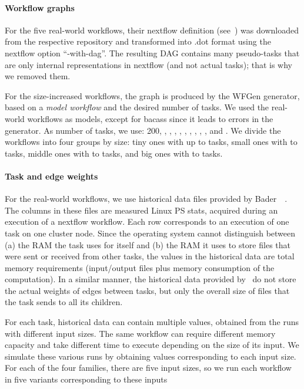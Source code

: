\documentclass[conference]{IEEEtran}
\begin{document}
\paragraph{Workflow graphs}
For the five real-world workflows, their nextflow definition (see~\cite{ewels2020nf}) was downloaded from the
respective repository and transformed into .dot format using the nextflow option ``-with-dag''.
The resulting DAG contains many pseudo-tasks that are only internal representations in nextflow
(and not actual tasks); that is why we removed them.

For the size-increased workflows, the graph is produced by the WFGen generator, based on a {\em model workflow} and
the desired number of tasks.
We used the real-world workflows as models, except for bacass since it leads to errors in the generator.
%
As number of tasks, we use: 200, , , , , ,
, , , , and .
We divide the workflows into four groups by size: tiny ones with up to  tasks, small ones with  to  tasks,
middle ones with  to  tasks, and big ones with  to  tasks.

    \paragraph{Task and edge weights}
    For the real-world workflows, we use historical data files provided by Bader~\etal~\cite{lotaru}.
    The columns in these files are measured Linux PS stats, acquired during an execution of a nextflow workflow.
    Each row corresponds to an execution of one task on one cluster node.
    Since the operating system cannot distinguish between (a) the RAM the task uses for itself and (b) the RAM it uses
    to store files that were sent or received from other tasks, the values in the historical data are total memory requirements (input/output files plus memory consumption of the computation).
    In a similar manner, the historical data provided by~\cite{lotaru} do not store the actual weights of edges between tasks, but only the overall
    size of files that the task sends to all its children.

    For each task, historical data can contain multiple values, obtained from the runs with different input sizes.
    The same workflow can require different memory capacity and take different time to execute
    depending on the size of its input.
    We simulate these various runs by obtaining values corresponding to each input size.
    For each of the four families, there are five input sizes, so we run each workflow in five variants corresponding to these inputs
\end{document}
